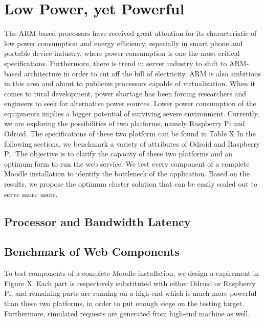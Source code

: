 \chapter{Low Power, yet Powerful}\label{benchmark}
The ARM-based processors have received great attention for its characteristic of low power consumption and energy efficiency, especially in smart phone and portable device industry, where power consumption is one the most critical specifications. Furthermore, there is trend in server industry to shift to ARM-based architecture in order to cut off the bill of electricity. ARM is also ambitious in this area and about to publicize processors capable of virtualization. When it comes to rural development, power shortage has been forcing researchers and engineers to seek for alternative power sources. Lower power consumption of the equipments implies a bigger potential of surviving severe environment.
Currently, we are exploring the possibilities of two platforms, namely Raspberry Pi and Odroid. The specifications of these two platform can be found in Table X
In the following sections, we benchmark a variety of attributes of Odroid and Raspberry Pi. The objective is to clarify the capacity of these two platforms and an optimum form to run the web service. We test every component of a complete Moodle installation to identify the bottleneck of the application. Based on the results, we propose the optimum cluster solution that can be easily scaled out to serve more users.

\section{Processor and Bandwidth Latency}


\section{Benchmark of Web Components}
To test components of a complete Moodle installation, we design a expirement in Figure X. Each part is respectively substituted with either Odroid or Raspberry Pi, and remaining parts are running on a high-end which is much more powerful than these two platforms, in order to put enough siege on the testing target. Furthermore, simulated requests are generated from high-end machine as well.

